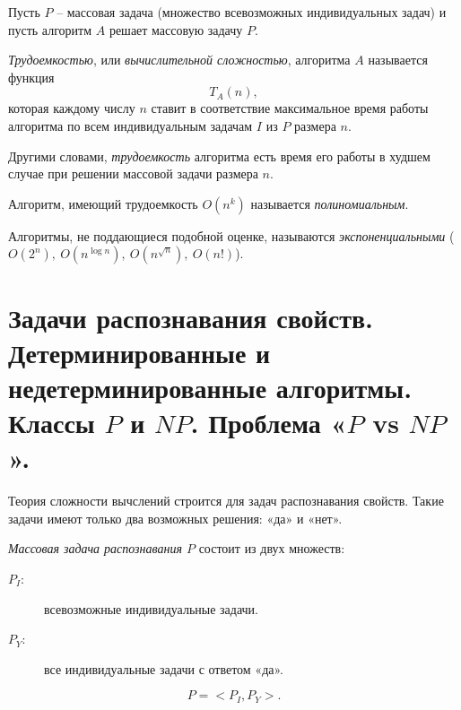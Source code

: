 \begin{note}
    Пусть $ P $ -- массовая задача (множество всевозможных индивидуальных задач) и пусть алгоритм $ A $ решает массовую задачу $ P $.
\end{note}

\begin{definition}
    \emph{Трудоемкостью}, или \emph{вычислительной сложностью}, алгоритма $ A $ называется функция
    \[
        T_A(n),
    \]
    которая каждому числу $ n $ ставит в соответствие максимальное время работы алгоритма по всем индивидуальным задачам $ I $ из $ P $ размера $ n $.

    Другими словами, \emph{трудоемкость} алгоритма есть время его работы в худшем случае при решении массовой задачи размера $ n $.
\end{definition}

\begin{definition}
    Алгоритм, имеющий трудоемкость $ O(n^k) $ называется \emph{полиномиальным}.

    Алгоритмы, не поддающиеся подобной оценке, называются \emph{экспоненциальными} ($ O(2^n), \ O(n^{\log n}), \ O(n^{\sqrt{n}}), \ O(n!) $).
\end{definition}

\newpage

\section{Задачи распознавания свойств. Детерминированные и недетерминированные алгоритмы. Классы $P$ и $NP$. Проблема «$P$ vs $NP$».}

\begin{note}
    Теория сложности вычслений строится для задач распознавания свойств. Такие задачи имеют только два возможных решения: «да» и «нет».
\end{note}

\begin{definition}
    \emph{Массовая задача распознавания $ P $} состоит из двух множеств:
    \begin{description}
        \item[$ P_I :$] всевозможные индивидуальные задачи.
        \item[$ P_Y :$] все индивидуальные задачи с ответом «да».
    \end{description}
    \[
        P = <P_I, P_Y>.
    \]
\end{definition}

